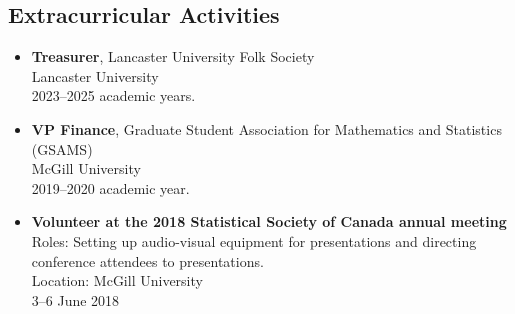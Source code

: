 \documentclass[11pt,]{scrartcl}
\begin{document}
\subsection{Extracurricular Activities}\label{extracurriculars}
\begin{itemize}
  \leftskip-0.25in
  \item \textbf{Treasurer}, Lancaster University Folk Society \\ Lancaster University\\2023--2025 academic years.
  \item \textbf{VP Finance}, Graduate Student Association for Mathematics and Statistics (GSAMS)\\ McGill University\\2019--2020 academic year.
  \item \textbf{Volunteer at the 2018 Statistical Society of Canada annual meeting}\\
  Roles: Setting up audio-visual equipment for presentations and directing conference attendees to presentations.\\
  Location: McGill University\\
  3--6 June 2018

\end{itemize}
%
\end{document}
